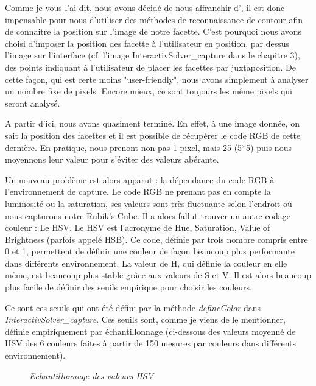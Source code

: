 Comme je vous l'ai dit, nous avons décidé de nous affranchir d', il est donc impensable pour nous d'utiliser des méthodes de reconnaissance de contour
afin de connaitre la position sur l'image de notre facette. 
C'est pourquoi nous avons choisi d'imposer la position des facette à l'utilisateur en position, par dessus l'image sur l'interface (cf. l'image InteractivSolver_capture
dans le chapitre 3), des points indiquant à l'utilisateur de placer les facettes par juxtaposition. De cette façon, qui est certe moins "user-friendly", nous avons simplement 
à analyser un nombre fixe de pixels. Encore mieux, ce sont toujours les même pixels qui seront analysé.

A partir d'ici, nous avons quasiment terminé. En effet, à une image donnée, on sait la position des facettes et il est possible de récupérer le code RGB de cette dernière. 
En pratique, nous prenont non pas 1 pixel, mais 25 (5*5) puis nous moyennons leur valeur pour s'éviter des valeurs abérante.

Un nouveau problème est alors apparut : la dépendance du code RGB à l'environnement de capture. Le code RGB ne prenant pas en compte la luminosité ou la saturation, ses valeurs 
sont très fluctuante selon l'endroit où nous capturons notre Rubik's Cube. Il a alors fallut trouver un autre codage couleur : Le HSV.
Le HSV est l'acronyme de Hue, Saturation, Value of Brightness (parfois appelé HSB). Ce code, définie par trois nombre compris entre 0 et 1, permettent de définir une couleur de façon 
beaucoup plus performante dans différents environnement. La valeur de H, qui définie la couleur en elle même, est beaucoup plus stable grâce aux valeurs de S et V. Il est alors beaucoup 
plus facile de définir des seuils empirique pour choisir les couleurs.

Ce sont ces seuils qui ont été défini par la méthode \textit{defineColor} dans \textit{InteractivSolver\_capture}.
Ces seuils sont, comme je viens de le mentionner, définie empiriquement par échantillonnage (ci-dessous des valeurs moyenné de HSV des 6 couleurs faites à partir de 150 mesures par couleurs dans différents environnement).

\begin{figure}[H]
\begin{center}
\end{center}
	\caption{ \textit{Echantillonnage des valeurs HSV}}
\end{figure}

